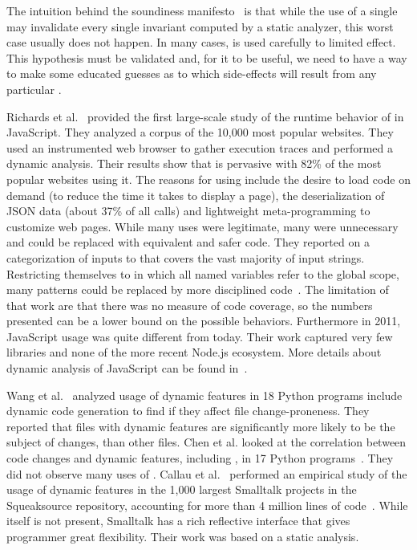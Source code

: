 \documentclass[conference]{IEEEtran}
\begin{document}
The intuition behind the soundiness manifesto~\cite{soundy} is that while
the use of a single \eval may invalidate every single invariant computed by
a static analyzer, this worst case usually does not happen.  In many cases,
\eval is used carefully to limited effect. This hypothesis must be validated
and, for it to be useful, we need to have a way to make some educated
guesses as to which side-effects will result from any particular \eval.

Richards et al.~\cite{ecoop11} provided the first large-scale study of the
runtime behavior of \eval in JavaScript. They analyzed a corpus of the
10,000 most popular websites. They used an instrumented web browser to
gather execution traces and performed a dynamic analysis.  Their results show
that \eval is pervasive with 82\% of the most popular websites using it. The
reasons for using \eval include the desire to load code on demand (to reduce
the time it takes to display a page), the deserialization of JSON data
(about 37\% of all calls) and lightweight meta-programming to customize web
pages.  While many uses \eval were legitimate, many were unnecessary and
could be replaced with equivalent and safer code.  They reported on a
categorization of inputs to \eval that covers the vast majority of input
strings.  Restricting themselves to \eval in which all named variables refer
to the global scope, many patterns could be replaced by more disciplined
code~\cite{oopsla12b}.  The limitation of that work are that there was no
measure of code coverage, so the numbers presented can be a lower bound on
the possible behaviors.  Furthermore in 2011, JavaScript usage was quite
different from today. Their work captured very few libraries and none of the
more recent Node.js ecosystem.  More details about dynamic analysis of
JavaScript can be found in~\cite{liang}.

Wang et al.~\cite{wang} analyzed usage of dynamic features in 18 Python
programs include dynamic code generation to find if they affect file
change-proneness.  They reported that files with dynamic features are
significantly more likely to be the subject of changes, than other files.
Chen et al. looked at the correlation between code changes and dynamic
features, including \eval, in 17 Python programs~\cite{chen}. They did not
observe many uses of \eval.  Callau et al.~\cite{oscar} performed an empirical study of
the usage of dynamic features in the 1,000 largest Smalltalk projects in the
Squeaksource repository, accounting for more than 4 million lines of
code~\cite{oscar}. While \eval itself is not present, Smalltalk has a rich
reflective interface that gives programmer great flexibility. Their work was
based on a static analysis.
\end{document}
